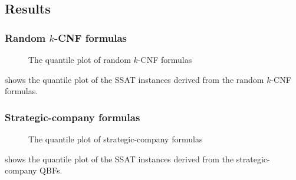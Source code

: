 \subsection{Results}

\subsubsection{Random $k$-CNF formulas}

\begin{figure*}[t]
    \centering
    
    \caption{The quantile plot of random $k$-CNF formulas}
    \label{fig:ressat-random-quantile}
\end{figure*}

 shows the quantile plot of the SSAT instances
derived from the random $k$-CNF formulas.

\subsubsection{Strategic-company formulas}

\begin{figure*}[t]
    \centering
    
    \caption{The quantile plot of strategic-company formulas}
    \label{fig:ressat-strategic-quantile}
\end{figure*}

 shows the quantile plot of the SSAT instances
derived from the strategic-company QBFs.